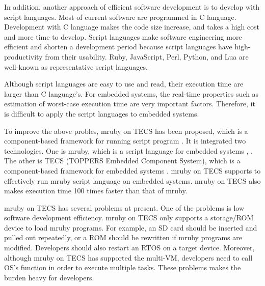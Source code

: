 \documentclass{sig-alternate-05-2015}
\begin{document}
In addition, another approach of efficient software development is to develop with script languages.
Most of current software are programmed in C language.
Development with C language makes the code size increase, and takes a high cost and more time to develop.
Script languages make software engineering more efficient and shorten a development period because script languages have high-productivity from their usability.
Ruby, JavaScript, Perl, Python, and Lua are well-known as representative script languages.

Although script languages are easy to use and read, their execution time are larger than C language's.
For embedded systems, the real-time properties such as estimation of worst-case execution time are very important factors.
Therefore, it is difficult to apply the script languages to embedded systems.

To improve the above probles, mruby on TECS has been proposed, which is a component-based framework for running script program \cite{par:mrubyonTECS}.
It is integrated two technologies.
One is mruby, which is a script language for embedded systems \cite{par:mruby}, \cite{url:mruby}.
The other is TECS (TOPPERS Embedded Component System), which is a component-based framework for embedded systems \cite{par:TECS} \cite{url:TOPPERS}.
mruby on TECS supports to effectively run mruby script language on embedded systems.
mruby on TECS also makes execution time 100 times faster than that of mruby.

mruby on TECS has several problems at present.
One of the problems is low software development efficiency.
mruby on TECS only supports a storage/ROM device to load mruby programs. 
For example, an SD card should be inserted and pulled out repeatedly, or a ROM should be rewritten if mruby programs are modified.
Developers should also restart an RTOS on a target device.
Moreover, although mruby on TECS has supported the multi-VM, developers need to call OS's function in order to execute multiple tasks.
These problems makes the burden heavy for developers.
\end{document}
